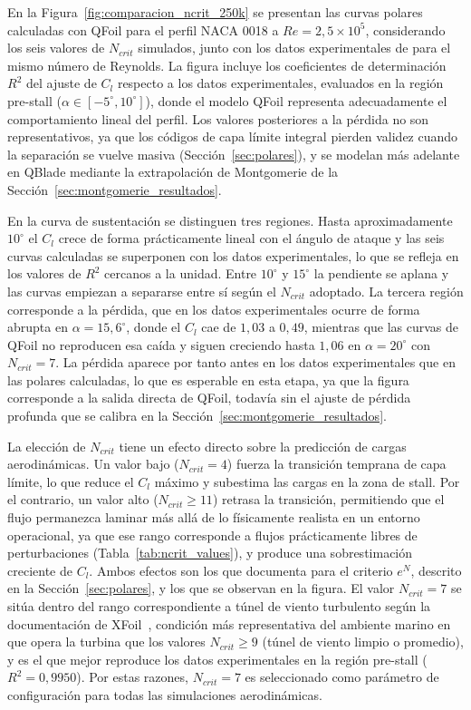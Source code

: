 En la Figura~\ref{fig:comparacion_ncrit_250k} se presentan las curvas polares calculadas con QFoil para el perfil NACA 0018 a $Re = 2{,}5 \times 10^5$, considerando los seis valores de $N_{crit}$ simulados, junto con los datos experimentales de \textcite{Bianchini2015} para el mismo número de Reynolds. La figura incluye los coeficientes de determinación $R^2$ del ajuste de $C_l$ respecto a los datos experimentales, evaluados en la región pre-stall ($\alpha \in [-5^\circ, 10^\circ]$), donde el modelo QFoil representa adecuadamente el comportamiento lineal del perfil. Los valores posteriores a la pérdida no son representativos, ya que los códigos de capa límite integral pierden validez cuando la separación se vuelve masiva (Sección~\ref{sec:polares}), y se modelan más adelante en QBlade mediante la extrapolación de Montgomerie de la Sección~\ref{sec:montgomerie_resultados}.

En la curva de sustentación se distinguen tres regiones. Hasta aproximadamente $10^\circ$ el $C_l$ crece de forma prácticamente lineal con el ángulo de ataque y las seis curvas calculadas se superponen con los datos experimentales, lo que se refleja en los valores de $R^2$ cercanos a la unidad. Entre $10^\circ$ y $15^\circ$ la pendiente se aplana y las curvas empiezan a separarse entre sí según el $N_{crit}$ adoptado. La tercera región corresponde a la pérdida, que en los datos experimentales ocurre de forma abrupta en $\alpha = 15{,}6^\circ$, donde el $C_l$ cae de $1{,}03$ a $0{,}49$, mientras que las curvas de QFoil no reproducen esa caída y siguen creciendo hasta $1{,}06$ en $\alpha = 20^\circ$ con $N_{crit} = 7$. La pérdida aparece por tanto antes en los datos experimentales que en las polares calculadas, lo que es esperable en esta etapa, ya que la figura corresponde a la salida directa de QFoil, todavía sin el ajuste de pérdida profunda que se calibra en la Sección~\ref{sec:montgomerie_resultados}.

La elección de $N_{crit}$ tiene un efecto directo sobre la predicción de cargas aerodinámicas. Un valor bajo ($N_{crit} = 4$) fuerza la transición temprana de capa límite, lo que reduce el $C_l$ máximo y subestima las cargas en la zona de stall. Por el contrario, un valor alto ($N_{crit} \geq 11$) retrasa la transición, permitiendo que el flujo permanezca laminar más allá de lo físicamente realista en un entorno operacional, ya que ese rango corresponde a flujos prácticamente libres de perturbaciones (Tabla~\ref{tab:ncrit_values}), y produce una sobrestimación creciente de $C_l$. Ambos efectos son los que documenta \textcite{drela1989xfoil} para el criterio $e^N$, descrito en la Sección~\ref{sec:polares}, y los que se observan en la figura. El valor $N_{crit} = 7$ se sitúa dentro del rango correspondiente a túnel de viento turbulento según la documentación de XFoil~\parencite{drela1989xfoil}, condición más representativa del ambiente marino en que opera la turbina que los valores $N_{crit} \geq 9$ (túnel de viento limpio o promedio), y es el que mejor reproduce los datos experimentales en la región pre-stall ($R^2 = 0{,}9950$). Por estas razones, $N_{crit} = 7$ es seleccionado como parámetro de configuración para todas las simulaciones aerodinámicas.

